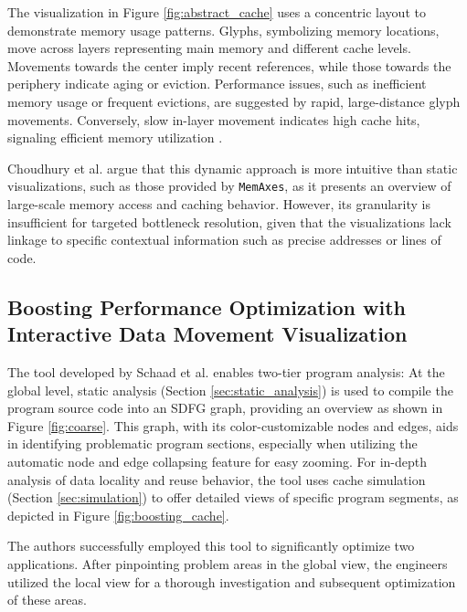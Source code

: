 The visualization in Figure \ref{fig:abstract_cache} uses a concentric layout to demonstrate memory usage patterns. Glyphs, symbolizing memory locations, move across layers representing main memory and different cache levels. Movements towards the center imply recent references, while those towards the periphery indicate aging or eviction. Performance issues, such as inefficient memory usage or frequent evictions, are suggested by rapid, large-distance glyph movements. Conversely, slow in-layer movement indicates high cache hits, signaling efficient memory utilization \cite{choudhury2011abstract}.

Choudhury et al. argue that this dynamic approach is more intuitive than static visualizations, such as those provided by \texttt{MemAxes}, as it presents an overview of large-scale memory access and caching behavior. However, its granularity is insufficient for targeted bottleneck resolution, given that the visualizations lack linkage to specific contextual information such as precise addresses or lines of code.

\subsection{Boosting Performance Optimization with Interactive Data Movement Visualization}\label{sec:boosting}
The tool developed by Schaad et al. \cite{schaad2021boosting,schaad2022boosting} enables two-tier program analysis: At the global level, static analysis (Section \ref{sec:static_analysis}) is used to compile the program source code into an SDFG graph, providing an overview as shown in Figure \ref{fig:coarse}. This graph, with its color-customizable nodes and edges, aids in identifying problematic program sections, especially when utilizing the automatic node and edge collapsing feature for easy zooming. For in-depth analysis of data locality and reuse behavior, the tool uses cache simulation (Section \ref{sec:simulation}) to offer detailed views of specific program segments, as depicted in Figure \ref{fig:boosting_cache}.

The authors successfully employed this tool to significantly optimize two applications. After pinpointing problem areas in the global view, the engineers utilized the local view for a thorough investigation and subsequent optimization of these areas.


